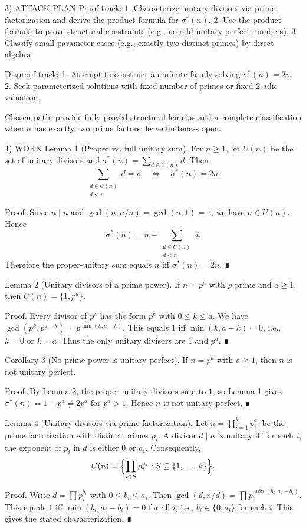 3) ATTACK PLAN
Proof track:
1. Characterize unitary divisors via prime factorization and derive the product formula for $\sigma^*(n)$.
2. Use the product formula to prove structural constraints (e.g., no odd unitary perfect numbers).
3. Classify small-parameter cases (e.g., exactly two distinct primes) by direct algebra.

Disproof track:
1. Attempt to construct an infinite family solving $\sigma^*(n)=2n$.
2. Seek parameterized solutions with fixed number of primes or fixed $2$-adic valuation.

Chosen path: provide fully proved structural lemmas and a complete classification when $n$ has exactly two prime factors;
leave finiteness open.

4) WORK
Lemma 1 (Proper vs. full unitary sum).
For $n\ge 1$, let $U(n)$ be the set of unitary divisors and $\sigma^*(n)=\sum_{d\in U(n)} d$. Then
\[
\sum_{\substack{d\in U(n) \\ d<n}} d = n \quad\Longleftrightarrow\quad \sigma^*(n)=2n.
\]

Proof.
Since $n\mid n$ and $\gcd(n,n/n)=\gcd(n,1)=1$, we have $n\in U(n)$. Hence
\[
\sigma^*(n) = n + \sum_{\substack{d\in U(n) \\ d<n}} d.
\]
Therefore the proper-unitary sum equals $n$ iff $\sigma^*(n)=2n$. ∎

Lemma 2 (Unitary divisors of a prime power).
If $n=p^a$ with $p$ prime and $a\ge 1$, then $U(n)=\{1,p^a\}$.

Proof.
Every divisor of $p^a$ has the form $p^k$ with $0\le k\le a$. We have
$\gcd(p^k,p^{a-k})=p^{\min(k,a-k)}$. This equals $1$ iff $\min(k,a-k)=0$, i.e.,
$k=0$ or $k=a$. Thus the only unitary divisors are $1$ and $p^a$. ∎

Corollary 3 (No prime power is unitary perfect).
If $n=p^a$ with $a\ge 1$, then $n$ is not unitary perfect.

Proof.
By Lemma 2, the proper unitary divisors sum to $1$, so Lemma 1 gives
$\sigma^*(n)=1+p^a\ne 2p^a$ for $p^a>1$. Hence $n$ is not unitary perfect. ∎

Lemma 4 (Unitary divisors via prime factorization).
Let $n=\prod_{i=1}^k p_i^{a_i}$ be the prime factorization with distinct primes $p_i$.
A divisor $d\mid n$ is unitary iff for each $i$, the exponent of $p_i$ in $d$ is either $0$ or $a_i$.
Consequently,
\[
U(n)=\Bigl\{\prod_{i\in S} p_i^{a_i} : S\subseteq \{1,\dots,k\}\Bigr\}.
\]

Proof.
Write $d=\prod p_i^{b_i}$ with $0\le b_i\le a_i$. Then
$\gcd(d,n/d)=\prod p_i^{\min(b_i,a_i-b_i)}$. This equals $1$ iff
$\min(b_i,a_i-b_i)=0$ for all $i$, i.e., $b_i\in\{0,a_i\}$ for each $i$.
This gives the stated characterization. ∎

